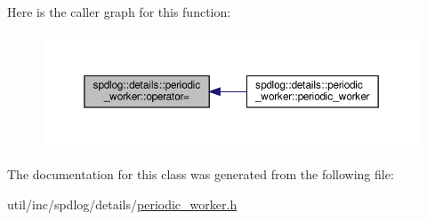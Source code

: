 Here is the caller graph for this function\+:
\nopagebreak
\begin{figure}[H]
\begin{center}
\leavevmode
\includegraphics[width=350pt]{classspdlog_1_1details_1_1periodic__worker_a81c0461ef77f85295b93991749df746b_icgraph}
\end{center}
\end{figure}


The documentation for this class was generated from the following file\+:\begin{DoxyCompactItemize}
\item 
util/inc/spdlog/details/\hyperlink{periodic__worker_8h}{periodic\+\_\+worker.\+h}\end{DoxyCompactItemize}
